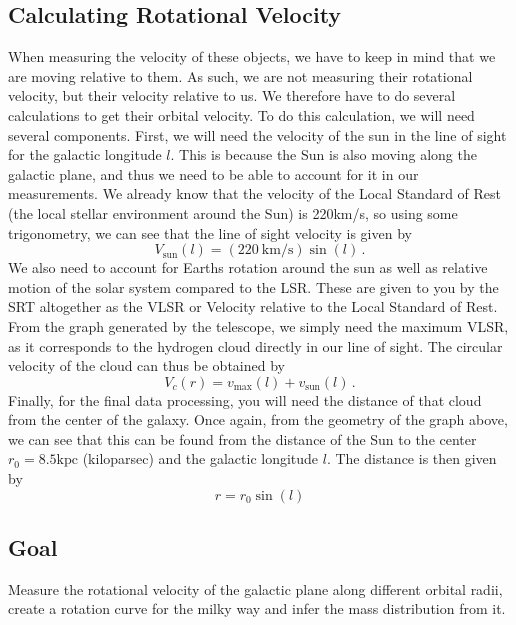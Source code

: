 \subsection{Calculating Rotational Velocity}
When measuring the velocity of these objects, we have to keep in mind that we are moving relative to them. As such, we are not measuring their rotational velocity, but their velocity relative to us. We therefore have to do several calculations to get their orbital velocity. To do this calculation, we will need several components. First, we will need the velocity of the sun in the line of sight for the galactic longitude $l$. This is because the Sun is also moving along the galactic plane, and thus we need to be able to account for it in our measurements. We already know that the velocity of the Local Standard of Rest (the local stellar environment around the Sun) is 220km/s, so using some trigonometry, we can see that the line of sight velocity is given by
\begin{equation}
 V_\textrm{sun}(l) = (220\:\mathrm{km}/\mathrm{s}) \sin(l) \,.
\end{equation}
We also need to account for Earths rotation around the sun as well as relative motion of the solar system compared to the LSR. These are given to you by the SRT altogether as the VLSR or Velocity relative to the Local Standard of Rest. From the graph generated by the telescope, we simply need the maximum VLSR, as it corresponds to the hydrogen cloud directly in our line of sight. The circular velocity of the cloud can thus be obtained by
\begin{equation}
 V_c(r) = v_\textrm{max} (l) + v_\textrm{sun}(l) \,.
\end{equation}
Finally, for the final data processing, you will need the distance of that cloud from the center of the galaxy. Once again, from the geometry of the graph above, we can see that this can be found from the distance of the Sun to the center $r_0 = 8.5\textrm{kpc}$ (kiloparsec) and the galactic longitude $l$. The distance is then given by
\begin{equation}
 r = r_0 \sin(l)
\end{equation}




\subsection{Goal}
Measure the rotational velocity of the galactic plane along different orbital radii, create a rotation curve for the milky way and infer the mass distribution from it.
